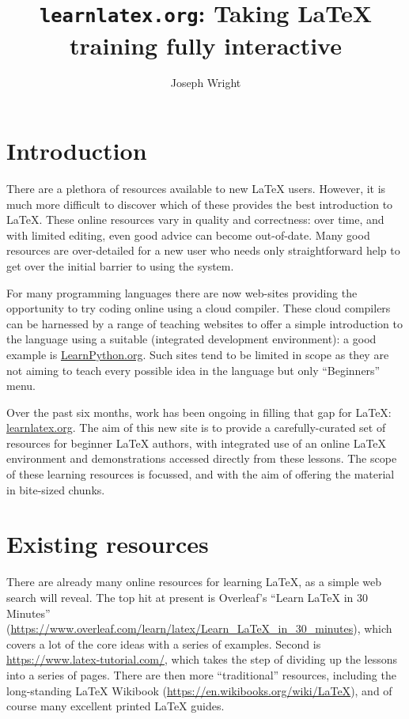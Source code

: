 \documentclass[harvardcite]{ltugboat}
\title{\texttt{learnlatex.org}: Taking \LaTeX{} training fully interactive}
\author{Joseph Wright}
\begin{document}
\maketitle

\section{Introduction}

There are a plethora of resources available to new \LaTeX{} users. However, it
is much more difficult to discover which of these provides the best
introduction to \LaTeX{}. These online resources vary in quality and correctness:
over time, and with limited editing, even good advice can become out-of-date.
Many good resources are over-detailed for a new user who needs only
straightforward help to get over the initial barrier to using the system.

For many programming languages there are now web-sites providing the
opportunity to try coding online using a cloud compiler. These cloud compilers
can be harnessed by a range of teaching websites to offer a simple introduction
to the language using a suitable  (integrated development
environment): a good example is \url{LearnPython.org}. Such sites tend to be
limited in scope as they are not aiming to teach every possible idea in the
language but only \enquote{Beginners} menu.

Over the past six months, work has been ongoing in filling that gap for
\LaTeX{}: \url{learnlatex.org}. The aim of this new site is to provide a
carefully-curated set of resources for beginner \LaTeX{} authors, with integrated
use of an online \LaTeX{} environment and demonstrations accessed directly from
these lessons. The scope of these learning resources is focussed, and with the
aim of offering the material in bite-sized chunks.

\section{Existing resources}

There are already many online resources for learning \LaTeX{}, as a simple web
search will reveal. The top hit at present is Overleaf's \enquote{Learn
\LaTeX{} in 30 Minutes}
(\url{https://www.overleaf.com/learn/latex/Learn_LaTeX_in_30_minutes}), which
covers a lot of the core ideas with a series of examples. Second is
\url{https://www.latex-tutorial.com/}, which takes the step of dividing up the
lessons into a series of pages. There are then more \enquote{traditional}
resources, including the long-standing \LaTeX{} Wikibook
(\url{https://en.wikibooks.org/wiki/LaTeX}), and of course many excellent
printed \LaTeX{} guides.
\end{document}
